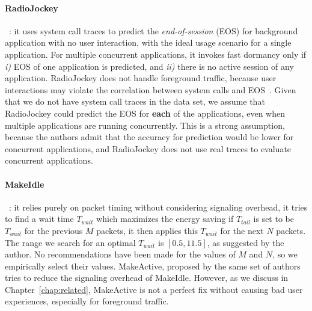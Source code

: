 \paragraph{RadioJockey}~\cite{radiojockey}: it uses system call traces to predict the {\em end-of-session} (EOS) for background application with no user interaction, with the ideal usage scenario for a single application. For multiple concurrent applications, it invokes fast dormancy only if {\em i)} EOS of one application is predicted, and {\em ii)} there is no active session of any application. RadioJockey does not handle foreground traffic, because user interactions may violate the correlation between system calls and EOS~\cite{radiojockey}. Given that we do not have system call traces in the \UMICH data set, we assume that RadioJockey could predict the EOS for {\bf each} of the applications, even when multiple applications are running concurrently. This is a strong assumption, because the authors admit that the accuracy for prediction would be lower for concurrent applications, and RadioJockey does not use real traces to evaluate concurrent applications.

\paragraph{MakeIdle}~\cite{makeidle}: it relies purely on packet timing without considering signaling overhead, \ie it tries to find a wait time $T_{wait}$ which maximizes the energy saving if $T_{tail}$ is set to be $T_{wait}$ for the previous $M$ packets, it then applies this $T_{wait}$ for the next $N$ packets. The range we search for an optimal $T_{wait}$ is $[0.5, 11.5]$, as suggested by the author.  No recommendations have been made for the values of $M$ and $N$, so we empirically select their values. MakeActive, proposed by the same set of authors tries to reduce the signaling overhead of MakeIdle. However, as we discuss in Chapter~\ref{chap:related}, MakeActive is not a perfect fix without causing bad user experiences, especially for foreground traffic.

